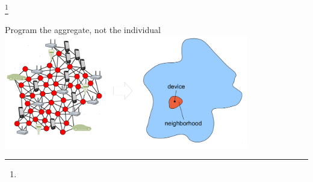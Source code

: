 \documentclass[presentation, 8pt,169]{beamer}\mode<presentation>{\usetheme{AMSBolognaFC}}
\begin{document}
\begin{frame}[plain]
\begin{center}
\Huge{\footnote{}}
\end{center}
\centering
\large{Program the aggregate, not the individual}
\\ \vspace{0.5cm}
\includegraphics[width=0.8\textwidth]{img/ac.png}
\end{frame}
\end{document}
